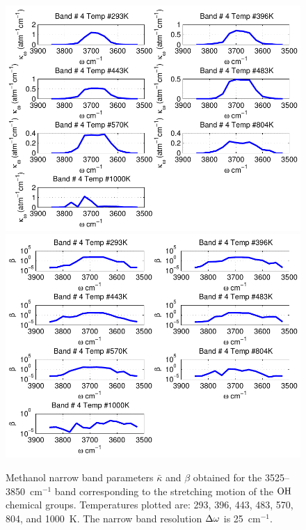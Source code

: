 \begin{figure}[p]
\begin{center}
\includegraphics[width=5.0in]{Figures/Methanol_Kappa_Band4_MALKMUS.pdf}
\includegraphics[width=5.0in]{Figures/Methanol_Beta_Band4_MALKMUS.pdf}
\end{center}
 \caption{Methanol narrow band parameters $\bar{\kappa}$ and $\beta$ obtained for the 3525--3850~cm$^{-1}$ band corresponding to the stretching motion of the $\rm OH$ chemical groups. Temperatures plotted are: 293, 396, 443, 483, 570, 804, and 1000~K. The narrow band resolution $\Delta \omega$ is 25~cm$^{-1}$.\label{fig:methanol_kappa_beta4}}
\end{figure}

\FloatBarrier

